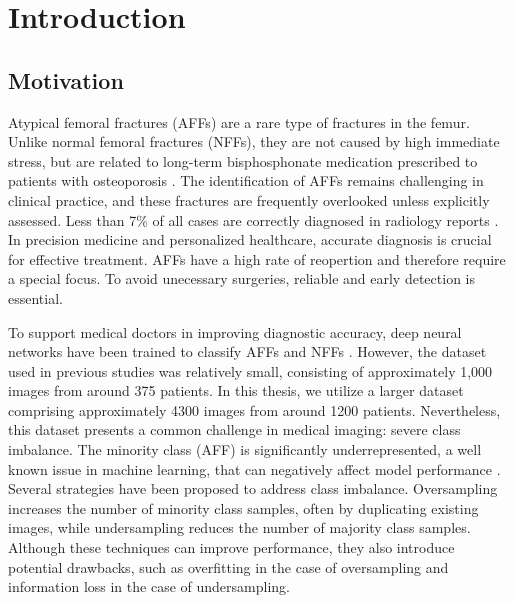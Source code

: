 

\chapter{Introduction}
\label{cha:introduction}

\section{Motivation}
\label{sec:motivation}

Atypical femoral fractures (AFFs) are a rare type of fractures in the femur. Unlike normal femoral fractures (NFFs), 
they are not caused by high immediate stress, but are related to long-term bisphosphonate medication prescribed to patients 
with osteoporosis \cite{schilcher_bisphosphonate_2011}. The identification of AFFs remains challenging in clinical practice, 
and these fractures are frequently overlooked unless explicitly assessed. Less than 7\% of all cases are correctly 
diagnosed in radiology reports \cite{zdolsek_deep_2021}. In precision medicine and personalized healthcare, accurate diagnosis is
crucial for effective treatment. AFFs have a high rate of reopertion \cite{bogl_increased_2020} and therefore require a special focus.   
To avoid unecessary surgeries, reliable and early detection is essential.

To support medical doctors in improving diagnostic accuracy, deep neural networks have been trained to classify AFFs and 
NFFs \cite{zdolsek_deep_2021}. However, the dataset used in previous studies was relatively small, consisting of approximately 
1,000 images from around 375 patients. In this thesis, we utilize a larger dataset comprising approximately
4300 images from around 1200 patients. Nevertheless, this dataset presents a common challenge in medical imaging: severe class imbalance. 
The minority class (AFF) is significantly underrepresented, a well known issue in machine learning, that can negatively affect model 
performance \cite{ghavidel_machine_2025}. 
Several strategies have been proposed to address class imbalance. Oversampling increases the number of minority class samples, 
often by duplicating existing images, while undersampling reduces the number of majority class samples. Although these techniques can 
improve performance, they also introduce potential drawbacks, such as overfitting in the case of oversampling and information loss in 
the case of undersampling.

